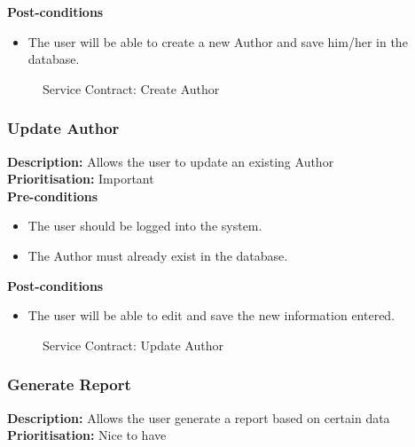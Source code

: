 \documentclass[a4paper]{article}
\begin{document}
    	\textbf{Post-conditions}
    	 \begin{itemize}
    		\item The user will be able to create a new Author and save him/her in the database.
    	\end{itemize}
    	
    	    	\begin{figure}[H]
    	    		\centering
    	    		\caption{Service Contract: Create Author}
    	    	\end{figure}
    	
    	\pagebreak
    \subsubsection{Update Author}
    	\textbf{Description:} Allows the user to update an existing Author\\
    	\textbf{Prioritisation:} Important\\
    	
    	\textbf{Pre-conditions}
    	 \begin{itemize}
    		\item The user should be logged into the system.
    		\item The Author must already exist in the database.
    	 \end{itemize}
    	
    	\textbf{Post-conditions}
    	 \begin{itemize}
    		\item The user will be able to edit and save the new information entered.
         \end{itemize}
    	    	\begin{figure}[H]
    	    		\centering
    	    		\caption{Service Contract: Update Author}
    	    	\end{figure}
    	
        \pagebreak
    \subsubsection{Generate Report}
    	\textbf{Description:} Allows the user generate a report based on certain data\\
    	\textbf{Prioritisation:} Nice to have\\
    	
\end{document}
